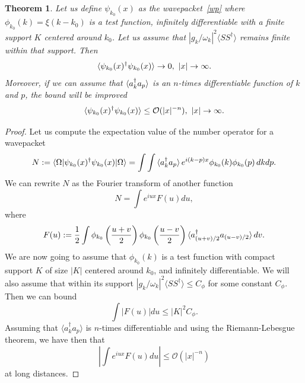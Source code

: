 \documentclass[notitlepage, prx, preprint, amsmath,superscriptaddress,amssymb]{revtex4-1}
\newtheorem{theorem}{Theorem}[section]
\begin{document}
\begin{theorem}
\label{eq:bound-x}
Let us define $\psi_{k_0}(x)$ as the wavepacket\ \eqref{wp} where $\phi_{k_0}(k)=\xi(k-k_0)$ is a test function, infinitely differentiable with a finite support $K$ centered around $k_0$. Let us assume that $|g_k/\omega_k|^2\langle S S^\dagger \rangle$ remains finite within that support. Then
\begin{equation}
\braket{\psi_{k_0}(x)^\dagger \psi_{k_0}(x)} \to 0,~|x|\to\infty.
\end{equation}
Moreover, if we can assume that $\braket{a_k^\dagger a_p}$ is an $n$-times differentiable function of $k$ and $p$, the bound will be improved
\begin{equation}
\braket{\psi_{k_0}(x)^\dagger \psi_{k_0}(x)} \leq  \mathcal{O}(|x|^{-n}), ~|x|\to\infty.
\end{equation}
\end{theorem}

\begin{proof}
Let us compute the expectation value of the number operator for a wavepacket
\begin{equation}
N := \braket{\Omega|\psi_{k_0}(x)^\dagger\psi_{k_0}(x)|\Omega}
= \int\int\braket{a_k^\dagger a_p} e^{i(k-p)x} \phi_{k_0}(k)\phi_{k_0}(p)\,dk dp.
\end{equation}
We can rewrite $N$ as the Fourier transform of another function
\begin{equation}
N = \int e^{i u x} F(u) du,
\end{equation}
where
\begin{equation}
F(u) := \frac{1}{2} \int \phi_{k_0}\left(\frac{u+v}{2}\right)\phi_{k_0}\left(\frac{u-v}{2}\right)
\braket{a_{(u+v)/2}^\dagger a_{(u-v)/2}}dv.
\end{equation}
We are now going to assume that $\phi_{k_0}(k)$ is a test function with compact support $K$ of size $|K|$ centered around $k_0$, and infinitely differentiable. We will also assume that within its support $|g_k/\omega_k|^2 \langle S S^\dagger \rangle \leq C_\phi$ for some constant $C_\phi$. Then we can bound
\begin{equation}
\int |F(u)|du \leq |K|^2 C_\phi.
\end{equation}
Assuming that $\langle a_k^\dagger a_p\rangle$ is $n$-times differentiable and 
using the Riemann-Lebesgue theorem, we have then that
\begin{equation}
\left|\int e^{i u x} F(u)du\right| \leq \mathcal{O}\left(|x|^{-n}\right)
\end{equation}
at long distances. 
\end{proof}
\end{document}
